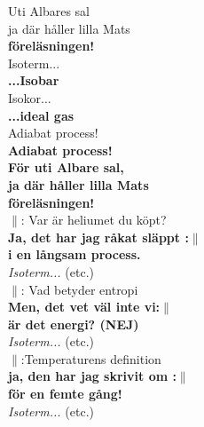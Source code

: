 \documentclass[a6paper, 10pt, twoside]{article}
\begin{document}
\begin{center} %
\end{center}
\begin{lyrics}
\small Uti Albares sal\\
ja där håller lilla Mats\\
\textbf{föreläsningen!}
\vspace{4pt}\\
Isoterm...\\
\textbf{...Isobar}\vspace{5pt}\\
Isokor...\\
\textbf{...ideal gas}\vspace{5pt}\\
Adiabat process!\\
\textbf{Adiabat process!}\vspace{5pt} \\
\textbf{För uti Albare sal,\\ ja där håller lilla Mats\\ föreläsningen!}\vspace{5pt}\\
$\|$: Var är heliumet du köpt? \\
\textbf{Ja, det har jag råkat släppt :$\|$ \\i en långsam process.}
\vspace{4pt} \\
\textit{Isoterm...} (etc.) 
\vspace{4pt} \\
$\|$: Vad betyder entropi\\
\textbf{Men, det vet väl inte vi:$\|$ \\är det energi? (NEJ)}
\vspace{4pt} \\
\textit{Isoterm...} (etc.)
\vspace{4pt} \\
$\|$:Temperaturens definition\\
\textbf{ja, den har jag skrivit om :$\|$ \\ för en femte gång!}
\vspace{4pt} \\
\textit{Isoterm...} (etc.)
\end{lyrics}


\end{document}
